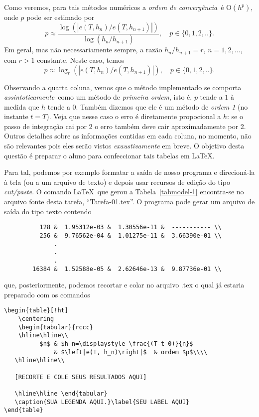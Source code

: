 \documentclass{article}
\begin{document}
Como veremos, para tais métodos numéricos a {\it ordem de convergência}\, é O$(h^p)$, onde $p$ pode ser estimado por
\[ p\approx  
\frac{ \log\left(\left|e(T,h_{n})/e(T,h_{n+1})\right|\right) }
     { \log\left(h_{n}/h_{n+1} \right)}
,\quad p\in \{0,1,2,..\}.
\]
Em geral, mas não necessariamente sempre, a razão $h_{n}/h_{n+1}=r$, $n=1,2,\ldots$, com $r>1$ constante. Neste caso, temos
\[ p\approx  
\log_r\left(\left|e(T,h_n)/e(T,h_{n+1})\right|\right),\quad p\in \{0,1,2,..\}.
\]

Observando a quarta coluna, vemos que o método implementado se comporta {\it assin\-toticamente}\, como um método de {\it primeira ordem}, isto é, $p$ tende a $1$ à medida que $h$ tende a $0$. Também dizemos que ele é um método de 
{\it ordem 1} (no instante $t=T$). Veja que nesse caso o erro é diretamente propocional a $h$: se o passo de integração cai por 2 o erro também deve cair aproximadamente por 2. Outros detalhes sobre as informações contidas em cada coluna, no momento, não são relevantes pois eles serão vistos {\it exaustivamente} em breve. O objetivo desta questão é preparar o aluno para confeccionar tais tabelas em \LaTeX. 

Para tal, podemos por exemplo formatar a saída de nosso programa e direcioná-la à tela (ou a um arquivo de texto) e depois usar recursos de edição do tipo {\it cut/paste}. O comando \LaTeX\, que gerou a Tabela~\ref{tabmodel-1} encontra-se no arquivo fonte desta tarefa, ``Tarefa-01.tex''. O programa  pode gerar um arquivo de saída do tipo texto contendo
\begin{verbatim}
          128 &  1.95312e-03 &  1.30556e-11 &  ----------- \\
          256 &  9.76562e-04 &  1.01275e-11 &  3.66390e-01 \\
              .
              .
              .    
        16384 &  1.52588e-05 &  2.62646e-13 &  9.87736e-01 \\
\end{verbatim}
que, posteriormente, podemos recortar e colar no arquivo .tex o qual já estaria preparado com os comandos
\begin{verbatim}
\begin{table}[!ht]
    \centering
    \begin{tabular}{rccc}
    \hline\hline\\
          $n$ & $h_n=\displaystyle \frac{(T-t_0)}{n}$ 
              & $\left|e(T, h_n)\right|$  & ordem $p$\\\\
   \hline\hline\\
   
   [RECORTE E COLE SEUS RESULTADOS AQUI]
   
   \hline\hline \end{tabular}
   \caption{SUA LEGENDA AQUI.}\label{SEU LABEL AQUI}
\end{table}
\end{verbatim}
\end{document}
